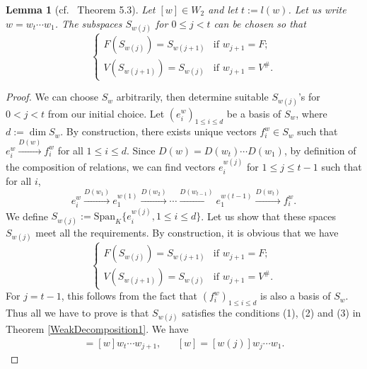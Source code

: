 \documentclass[12pt]{amsart}
\newtheorem{lemma}[theorem]{Lemma}
\theoremstyle{definition}
\newcommand{\<}{\langle}   %
\renewcommand{\>}{\rangle} %
\begin{document}
\begin{lemma}[cf.~\cite{gelfand-ponomarev:1968} Theorem 5.3]\label{LemmaTechnicalSecondKind}
    Let $[w] \in W_2$ and let $t := l(w)$. Let us write $w = w_t \cdots w_1$. The subspaces $S_{w(j)}$ for $0 \leq j < t$ can be chosen so that 
    \begin{equation*}
        \begin{cases}
            F(S_{w(j)}) = S_{w(j+1)} & \text{if } w_{j+1} = F;\\
            V(S_{w(j+1)}) = S_{w(j)} & \text{if } w_{j+1} = V^{\#}.
        \end{cases}
    \end{equation*}
\end{lemma}

\begin{proof}
    We can choose $S_w$ arbitrarily, then determine suitable $S_{w(j)}$'s for $0 < j < t$ from our initial choice. Let $(e_i^w)_{1\leq i \leq d}$ be a basis of $S_w$, where $d := \dim S_w$. By construction, there exists unique vectors $f_i^w \in S_w$ such that $e_i^w \xrightarrow{D(w)} f_i^w$ for all $1\leq i \leq d$. Since $D(w) = D(w_t)\cdots D(w_1)$, by definition of the composition of relations, we can find vectors $e_i^{w(j)}$ for $1 \leq j \leq t-1$ such that for all $i$,
    \begin{equation*}
        e_i^w \xrightarrow{D(w_1)} e_1^{w(1)} \xrightarrow{D(w_2)} \cdots \xrightarrow{D(w_{t-1})} e_1^{w(t-1)} \xrightarrow{D(w_t)} f_i^{w}.
    \end{equation*}
    We define $S_{w(j)} := \mathrm{Span}_K\{e_i^{w(j)}, 1\leq i \leq d\}$. Let us show that these spaces $S_{w(j)}$ meet all the requirements. By construction, it is obvious that we have 
        \begin{equation*}
        \begin{cases}
            F(S_{w(j)}) = S_{w(j+1)} & \text{if } w_{j+1} = F;\\
            V(S_{w(j+1)}) = S_{w(j)} & \text{if } w_{j+1} = V^{\#}.
        \end{cases}
    \end{equation*}
    For $j = t-1$, this follows from the fact that $(f_i^w)_{1\leq i \leq d}$ is also a basis of $S_w$. Thus all we have to prove is that $S_{w(j)}$ satisfies the conditions (1), (2) and (3) in Theorem \ref{WeakDecomposition1}. We have 
    \begin{align*}
        [w(j)] = [w]w_t\cdots w_{j+1}, & & [w] = [w(j)]w_j\cdots w_1.
    \end{align*}

\end{proof}
\end{document}
